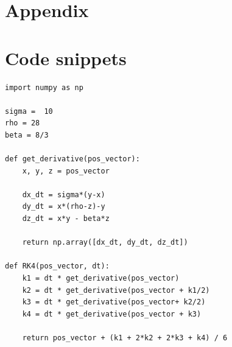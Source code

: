 \documentclass[11pt]{article}
\begin{document}
\appendix
\section*{Appendix}
\section{Code snippets}
\label{appendix:code}

\begin{lstlisting}[label=rk4:lorenz, caption={RK4 implementation}]
import numpy as np

sigma =  10
rho = 28
beta = 8/3

def get_derivative(pos_vector):
    x, y, z = pos_vector

    dx_dt = sigma*(y-x)
    dy_dt = x*(rho-z)-y
    dz_dt = x*y - beta*z

    return np.array([dx_dt, dy_dt, dz_dt])

def RK4(pos_vector, dt):
    k1 = dt * get_derivative(pos_vector)
    k2 = dt * get_derivative(pos_vector + k1/2)
    k3 = dt * get_derivative(pos_vector+ k2/2)
    k4 = dt * get_derivative(pos_vector + k3)

    return pos_vector + (k1 + 2*k2 + 2*k3 + k4) / 6

\end{lstlisting}
\end{document}
